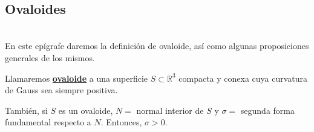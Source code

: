 ${ }$\\
\subsection{Ovaloides}
${ }$\\

En este epígrafe daremos la definición de ovaloide, así como algunas proposiciones generales de los mismos.
${ }$\\

\begin{definicion}
	Llamaremos \underline{\textbf{ovaloide}} a una superficie $S \subset \mathbb{R}^3$ compacta y conexa cuya curvatura de Gauss sea siempre positiva.
	
	También, si $S$ es un ovaloide, $N =$ normal interior de $S$ y $\sigma =$ segunda forma fundamental respecto a $N$. Entonces, $\sigma > 0$.
\end{definicion}
${ }$\\


